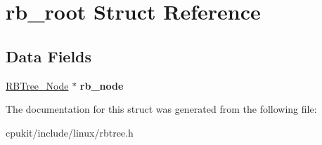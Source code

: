 \hypertarget{structrb__root}{}\section{rb\+\_\+root Struct Reference}
\label{structrb__root}
\subsection*{Data Fields}
\begin{DoxyCompactItemize}
\item 
\mbox{\label{structrb__root_a9bbc8acd3a001609a1ba160ef2a0af97}} 
\mbox{\hyperlink{structRBTree__Node}{R\+B\+Tree\+\_\+\+Node}} $\ast$ {\bfseries rb\+\_\+node}
\end{DoxyCompactItemize}


The documentation for this struct was generated from the following file\+:\begin{DoxyCompactItemize}
\item 
cpukit/include/linux/rbtree.\+h\end{DoxyCompactItemize}
